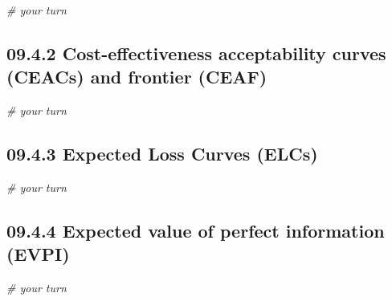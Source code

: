 \documentclass[]{article}
\newenvironment{Shaded}{\begin{snugshade}}{\end{snugshade}}
\newcommand{\CommentTok}[1]{\textcolor[rgb]{0.56,0.35,0.01}{\textit{#1}}}
\begin{document}
\begin{Shaded}
\begin{Highlighting}[]
\CommentTok{# your turn}
\end{Highlighting}
\end{Shaded}

\subsection{09.4.2 Cost-effectiveness acceptability curves (CEACs) and
frontier
(CEAF)}\label{cost-effectiveness-acceptability-curves-ceacs-and-frontier-ceaf}

\begin{Shaded}
\begin{Highlighting}[]
\CommentTok{# your turn}
\end{Highlighting}
\end{Shaded}

\subsection{09.4.3 Expected Loss Curves
(ELCs)}\label{expected-loss-curves-elcs}

\begin{Shaded}
\begin{Highlighting}[]
\CommentTok{# your turn}
\end{Highlighting}
\end{Shaded}

\subsection{09.4.4 Expected value of perfect information
(EVPI)}\label{expected-value-of-perfect-information-evpi}

\begin{Shaded}
\begin{Highlighting}[]
\CommentTok{# your turn}
\end{Highlighting}
\end{Shaded}
\end{document}
